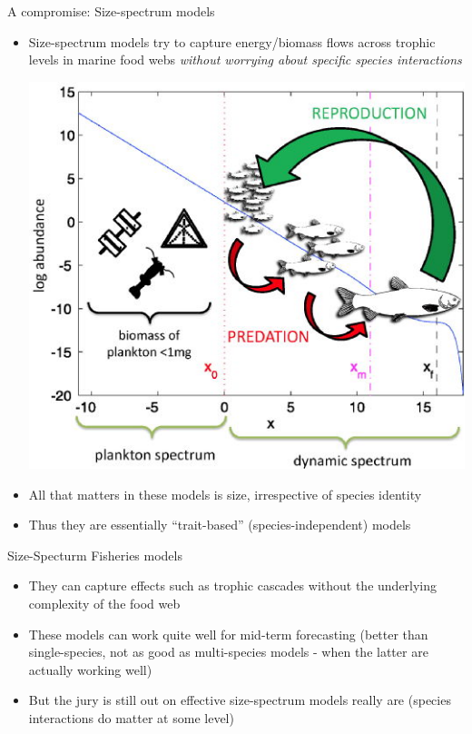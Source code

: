 \documentclass[xcolor={usenames,x11names},compress]{beamer}
\renewcommand{\(}{\begin{columns}}
\renewcommand{\)}{\end{columns}}
\newcommand{\<}[1]{\begin{column}{#1}}
\renewcommand{\>}{\end{column}}
\begin{document}
\begin{frame}{A compromise: Size-spectrum models}

  \begin{itemize}
     \item Size-spectrum models try to capture energy/biomass flows across trophic levels in  marine food webs {\it without worrying about specific species interactions}
     
     \begin{center}
        \includegraphics[width=.35\textwidth]{size_spectrum.jpg} 
     \end{center}

     \item All that matters in these models is size, irrespective of species identity
     
     \item Thus they are essentially ``trait-based'' (species-independent) models

  \end{itemize}

\end{frame}

\begin{frame}{Size-Specturm Fisheries models}

  \begin{itemize}\itemsep10pt
     
    \item They can capture effects such as trophic cascades without the underlying complexity of the food web

    \item These models can work quite well for mid-term forecasting (better than single-species, not as good as multi-species models - when the latter are actually working well) 
    
    \item But the jury is still out on effective size-spectrum models really are (species interactions do matter at some level)

  \end{itemize}

\end{frame}
\end{document}
